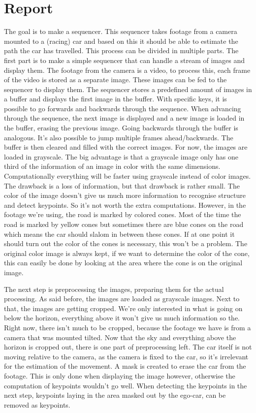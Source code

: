 \chapter{Report}

The goal is to make a sequencer. This sequencer takes footage from a camera mounted to a (racing) car and based on this it should be able to estimate the path the car has travelled. This process can be divided in multiple parts. The first part is to make a simple sequencer that can handle a stream of images and display them. The footage from the camera is a video, to process this, each frame of the video is stored as a separate image. These images can be fed to the sequencer to display them. The sequencer stores a predefined amount of images in a buffer and displays the first image in the buffer. With specific keys, it is possible to go forwards and backwards through the sequence. When advancing through the sequence, the next image is displayed and a new image is loaded in the buffer, erasing the previous image. Going backwards through the buffer is analogous. It's also possible to jump multiple frames ahead/backwards. The buffer is then cleared and filled with the correct images. For now, the images are loaded in grayscale. The big advantage is that a grayscale image only has one third of the information of an image in color with the same dimensions. Computationally everything will be faster using grayscale instead of color images. The drawback is a loss of information, but that drawback is rather small. The color of the image doesn't give us much more information to recognise structure and detect keypoints. So it's not worth the extra computations. However, in the footage we're using, the road is marked by colored cones. Most of the time the road is marked by yellow cones but sometimes there are blue cones on the road which means the car should slalom in between these cones. If at one point it should turn out the color of the cones is necessary, this won't be a problem. The original color image is always kept, if we want to determine the color of the cone, this can easily be done by looking at the area where the cone is on the original image.

The next step is preprocessing the images, preparing them for the actual processing. As said before, the images are loaded as grayscale images. Next to that, the images are getting cropped. We're only interested in what is going on below the horizon, everything above it won't give us much information so the. Right now, there isn't much to be cropped, because the footage we have is from a camera that was mounted tilted. Now that the sky and everything above the horizon is cropped out, there is one part of preprocessing left. The car itself is not moving relative to the camera, as the camera is fixed to the car, so it's irrelevant for the estimation of the movement. A mask is created to erase the car from the footage. This is only done when displaying the image however, otherwise the computation of keypoints wouldn't go well. When detecting the keypoints in the next step, keypoints laying in the area masked out by the ego-car, can be removed as keypoints.